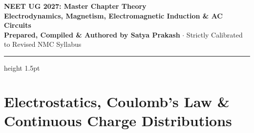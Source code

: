 \documentclass[10pt,a4paper]{article}
\begin{document}
\begin{center}
  {\Huge \textbf{NEET UG 2027: Master Chapter Theory}}\\[6pt]
  {\Large \textbf{Electrodynamics, Magnetism, Electromagnetic Induction \& AC Circuits}}\\[4pt]
  {\small \textbf{Prepared, Compiled \& Authored by Satya Prakash} $\cdot$ Strictly Calibrated to Revised NMC Syllabus}
  \vspace{4pt}
  \hrule height 1.5pt
\end{center}

\section{Electrostatics, Coulomb's Law \& Continuous Charge Distributions}
\end{document}
